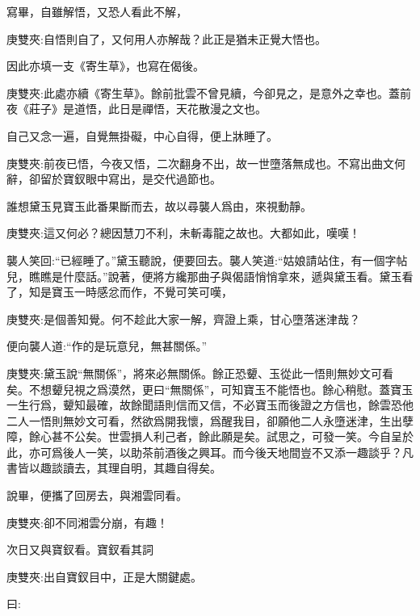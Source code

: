 \begin{parag}
    寫畢，自雖解悟，又恐人看此不解，\begin{note}庚雙夾:自悟則自了，又何用人亦解哉？此正是猶未正覺大悟也。\end{note}因此亦填一支《寄生草》，也寫在偈後。\begin{note}庚雙夾:此處亦續《寄生草》。餘前批雲不曾見續，今卻見之，是意外之幸也。蓋前夜《莊子》是道悟，此日是禪悟，天花散漫之文也。\end{note}自己又念一遍，自覺無掛礙，中心自得，便上牀睡了。\begin{note}庚雙夾:前夜已悟，今夜又悟，二次翻身不出，故一世墮落無成也。不寫出曲文何辭，卻留於寶釵眼中寫出，是交代過節也。\end{note}
\end{parag}


\begin{parag}
    誰想黛玉見寶玉此番果斷而去，故以尋襲人爲由，來視動靜。\begin{note}庚雙夾:這又何必？總因慧刀不利，未斬毒龍之故也。大都如此，嘆嘆！\end{note}襲人笑回:“已經睡了。”黛玉聽說，便要回去。襲人笑道:“姑娘請站住，有一個字帖兒，瞧瞧是什麼話。”說著，便將方纔那曲子與偈語悄悄拿來，遞與黛玉看。黛玉看了，知是寶玉一時感忿而作，不覺可笑可嘆，\begin{note}庚雙夾:是個善知覺。何不趁此大家一解，齊證上乘，甘心墮落迷津哉？\end{note}便向襲人道:“作的是玩意兒，無甚關係。”\begin{note}庚雙夾:黛玉說“無關係”，將來必無關係。餘正恐顰、玉從此一悟則無妙文可看矣。不想顰兒視之爲漠然，更曰“無關係”，可知寶玉不能悟也。餘心稍慰。蓋寶玉一生行爲，顰知最確，故餘聞語則信而又信，不必寶玉而後證之方信也，餘雲恐他二人一悟則無妙文可看，然欲爲開我懷，爲醒我目，卻願他二人永墮迷津，生出孽障，餘心甚不公矣。世雲損人利己者，餘此願是矣。試思之，可發一笑。今自呈於此，亦可爲後人一笑，以助茶前酒後之興耳。而今後天地間豈不又添一趣談乎？凡書皆以趣談讀去，其理自明，其趣自得矣。\end{note}說畢，便攜了回房去，與湘雲同看。\begin{note}庚雙夾:卻不同湘雲分崩，有趣！\end{note}次日又與寶釵看。寶釵看其詞\begin{note}庚雙夾:出自寶釵目中，正是大關鍵處。\end{note}曰:
\end{parag}


